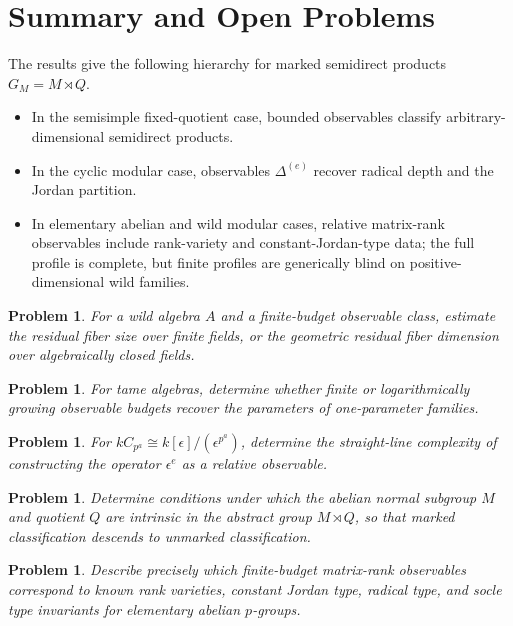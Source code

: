 \documentclass[11pt]{article}
\newtheorem{problem}[theorem]{Problem}
\begin{document}
\section{Summary and Open Problems}

The results give the following hierarchy for marked semidirect products $G_M=M\rtimes Q$.

\begin{itemize}
\item In the semisimple fixed-quotient case, bounded observables classify arbitrary-dimensional semidirect products.
\item In the cyclic modular case, observables $\Delta^{(e)}$ recover radical depth and the Jordan partition.
\item In elementary abelian and wild modular cases, relative matrix-rank observables include rank-variety and constant-Jordan-type data; the full profile is complete, but finite profiles are generically blind on positive-dimensional wild families.
\end{itemize}

\begin{problem}
For a wild algebra $A$ and a finite-budget observable class, estimate the residual fiber size over finite fields, or the geometric residual fiber dimension over algebraically closed fields.
\end{problem}

\begin{problem}
For tame algebras, determine whether finite or logarithmically growing observable budgets recover the parameters of one-parameter families.
\end{problem}

\begin{problem}
For $kC_{p^a}\cong k[\epsilon]/(\epsilon^{p^a})$, determine the straight-line complexity of constructing the operator $\epsilon^e$ as a relative observable.
\end{problem}

\begin{problem}
Determine conditions under which the abelian normal subgroup $M$ and quotient $Q$ are intrinsic in the abstract group $M\rtimes Q$, so that marked classification descends to unmarked classification.
\end{problem}

\begin{problem}
Describe precisely which finite-budget matrix-rank observables correspond to known rank varieties, constant Jordan type, radical type, and socle type invariants for elementary abelian $p$-groups.
\end{problem}
\end{document}
